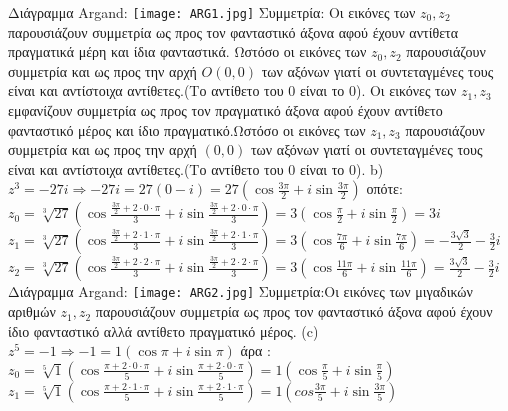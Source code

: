 \documentclass{article}
\begin{document}
Διάγραμμα Argand:\newline
\texttt{[image: ARG1.jpg]} \newline
Συμμετρία: Οι εικόνες των $z_0,z_2$ παρουσιάζουν συμμετρία ως προς τον φανταστικό άξονα αφού έχουν αντίθετα πραγματικά μέρη και ίδια φανταστικά. Ωστόσο οι εικόνες των $z_0 , z_2$ παρουσιάζουν συμμετρία και ως προς την αρχή $O(0,0)$ των αξόνων γιατί οι συντεταγμένες τους είναι και αντίστοιχα αντίθετες.(Το αντίθετο του 0 είναι το 0). Οι εικόνες των $z_1,z_3$ εμφανίζουν συμμετρία ως προς τον πραγματικό άξονα  αφού έχουν αντίθετο φανταστικό μέρος και ίδιο πραγματικό.Ωστόσο οι εικόνες των $z_1 , z_3$ παρουσιάζουν συμμετρία και ως προς την αρχή $(0,0)$ των αξόνων γιατί οι συντεταγμένες τους είναι και αντίστοιχα αντίθετες.(Το αντίθετο του 0 είναι το 0).
\newline
b)$z^3=-27i \Rightarrow -27i=27(0-i)=27(\cos{\frac{3\pi}{2}}+i\sin{\frac{3\pi}{2}})$ οπότε: \newline
$z_0=\sqrt[3]{27}(\cos{\frac{\frac{3\pi}{2}+2\cdot0\cdot\pi}{3}}+i\sin{\frac{\frac{3\pi}{2}+2\cdot0\cdot\pi}{3}})=3(\cos{\frac{\pi}{2}}+i\sin{\frac{\pi}{2}})=3i$ \newline
$z_1=\sqrt[3]{27}(\cos{\frac{\frac{3\pi}{2}+2\cdot1\cdot\pi}{3}}+i\sin{\frac{\frac{3\pi}{2}+2\cdot1\cdot\pi}{3}})=3(\cos{\frac{7\pi}{6}}+i\sin{\frac{7\pi}{6}})=-\frac{3\sqrt3}{2}-\frac{3}{2}i$ \newline
$z_2=\sqrt[3]{27}(\cos{\frac{\frac{3\pi}{2}+2\cdot2\cdot\pi}{3}}+i\sin{\frac{\frac{3\pi}{2}+2\cdot2\cdot\pi}{3}})=3(\cos{\frac{11\pi}{6}}+i\sin{\frac{11\pi}{6}})=\frac{3\sqrt3}{2} -\frac{3}{2}i$ \newline
Διάγραμμα Argand:\newline
\texttt{[image: ARG2.jpg]} \newline
Συμμετρία:Οι εικόνες των μιγαδικών αριθμών $z_1,z_2$ παρουσιάζουν συμμετρία ως προς τον φανταστικό άξονα αφού έχουν ίδιο φανταστικό αλλά αντίθετο πραγματικό μέρος.\newline
(c)\newline $z^5=-1 \Rightarrow -1=1(\cos\pi+i\sin\pi)$ άρα :\newline
$z_0=\sqrt[5]{1}(\cos{\frac{\pi+2\cdot0\cdot\pi}{5}}+i\sin{\frac{\pi+2\cdot0\cdot\pi}{5}})=1(\cos{\frac{\pi}{5}}+i\sin{\frac{\pi}{5}})$ \newline
$z_1=\sqrt[5]{1}(\cos{\frac{\pi+2\cdot1\cdot\pi}{5}}+i\sin{\frac{\pi+2\cdot1\cdot\pi}{5}})=1(cos{\frac{3\pi}{5}}+i\sin{\frac{3\pi}{5}})$ \newline
\end{document}
